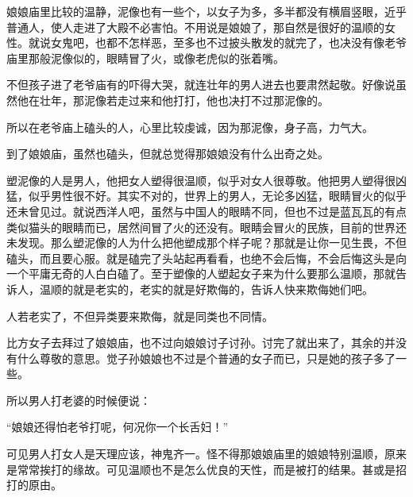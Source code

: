 \par 娘娘庙里比较的温静，泥像也有一些个，以女子为多，多半都没有横眉竖眼，近乎普通人，使人走进了大殿不必害怕。不用说是娘娘了，那自然是很好的温顺的女性。就说女鬼吧，也都不怎样恶，至多也不过披头散发的就完了，也决没有像老爷庙里那般泥像似的，眼睛冒了火，或像老虎似的张着嘴。
\par 不但孩子进了老爷庙有的吓得大哭，就连壮年的男人进去也要肃然起敬。好像说虽然他在壮年，那泥像若走过来和他打打，他也决打不过那泥像的。
\par 所以在老爷庙上磕头的人，心里比较虔诚，因为那泥像，身子高，力气大。
\par 到了娘娘庙，虽然也磕头，但就总觉得那娘娘没有什么出奇之处。
\par 塑泥像的人是男人，他把女人塑得很温顺，似乎对女人很尊敬。他把男人塑得很凶猛，似乎男性很不好。其实不对的，世界上的男人，无论多凶猛，眼睛冒火的似乎还未曾见过。就说西洋人吧，虽然与中国人的眼睛不同，但也不过是蓝瓦瓦的有点类似猫头的眼睛而已，居然间冒了火的还没有。眼睛会冒火的民族，目前的世界还未发现。那么塑泥像的人为什么把他塑成那个样子呢？那就是让你一见生畏，不但磕头，而且要心服。就是磕完了头站起再看看，也绝不会后悔，不会后悔这头是向一个平庸无奇的人白白磕了。至于塑像的人塑起女子来为什么要那么温顺，那就告诉人，温顺的就是老实的，老实的就是好欺侮的，告诉人快来欺侮她们吧。
\par 人若老实了，不但异类要来欺侮，就是同类也不同情。
\par 比方女子去拜过了娘娘庙，也不过向娘娘讨子讨孙。讨完了就出来了，其余的并没有什么尊敬的意思。觉子孙娘娘也不过是个普通的女子而已，只是她的孩子多了一些。
\par 所以男人打老婆的时候便说：
\par “娘娘还得怕老爷打呢，何况你一个长舌妇！”
\par 可见男人打女人是天理应该，神鬼齐一。怪不得那娘娘庙里的娘娘特别温顺，原来是常常挨打的缘故。可见温顺也不是怎么优良的天性，而是被打的结果。甚或是招打的原由。
